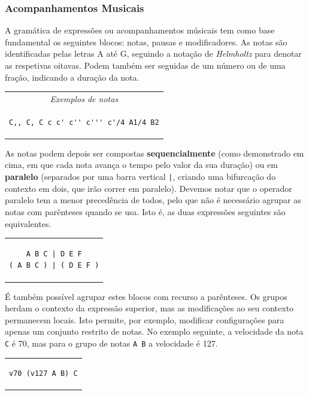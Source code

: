 \documentclass[
  oneside,
  11pt, a4paper,
  footinclude=true,
  headinclude=true,
  cleardoublepage=empty
]{scrbook}
\begin{document}
	\subsubsection{Acompanhamentos Musicais}
	A gramática de expressões ou acompanhamentos músicais tem como base fundamental os seguintes blocos: notas, pausas e modificadores. As notas são identificadas pelas letras A até G, seguindo a notação de \textit{Helmholtz}\cite{helmholtz-pitch-notation} para denotar as respetivas oitavas. Podem também ser seguidas de um número ou de uma fração, indicando a duração da nota.


\begin{center}
\begin{tabular}{c}
\textit{Exemplos de notas} \\
\begin{lstlisting}[backgroundcolor=\color{transparent}]
C,, C, C c c' c'' c''' c'/4 A1/4 B2
\end{lstlisting}
\end{tabular}
\end{center}

As notas podem depois ser compostas \textbf{sequencialmente} (como demonstrado em cima, em que cada nota avança o tempo pelo valor da sua duração) ou em \textbf{paralelo} (separados por uma barra vertical \texttt{|}, criando uma bifurcação do contexto em dois, que irão correr em paralelo). Devemos notar que o operador paralelo tem a menor precedência de todos, pelo que não é necessário agrupar as notas com parênteses quando se usa. Isto é, as duas expressões seguintes são equivalentes.

\begin{center}
\begin{tabular}{c}
\begin{lstlisting}[backgroundcolor=\color{transparent}]
    A B C | D E F
( A B C ) | ( D E F )
\end{lstlisting}
\end{tabular}
\end{center}

É também possível agrupar estes blocos com recurso a parênteses. Os grupos herdam o contexto da expressão superior, mas as modificações ao seu contexto permanecem locais. Isto permite, por exemplo, modificar configurações para apenas um conjunto restrito de notas. No exemplo seguinte, a velocidade da nota \texttt{C} é 70, mas para o grupo de notas \texttt{A B} a velocidade é 127.

\begin{center}
\begin{tabular}{c}
\begin{lstlisting}[backgroundcolor=\color{transparent}]
 v70 (v127 A B) C
\end{lstlisting}
\end{tabular}
\end{center}
\end{document}
